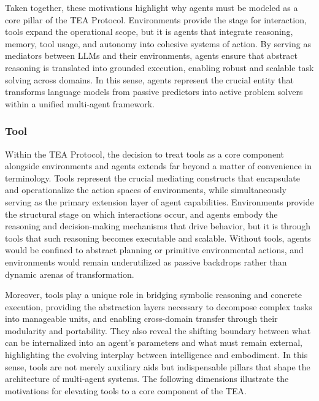 \documentclass[11pt]{article}
\begin{document}
Taken together, these motivations highlight why agents must be modeled as a core pillar of the TEA Protocol. Environments provide the stage for interaction, tools expand the operational scope, but it is agents that integrate reasoning, memory, tool usage, and autonomy into cohesive systems of action. By serving as mediators between LLMs and their environments, agents ensure that abstract reasoning is translated into grounded execution, enabling robust and scalable task solving across domains. In this sense, agents represent the crucial entity that transforms language models from passive predictors into active problem solvers within a unified multi-agent framework.   

\subsubsection{Tool}

Within the TEA Protocol, the decision to treat tools as a core component alongside environments and agents extends far beyond a matter of convenience in terminology. Tools represent the crucial mediating constructs that encapsulate and operationalize the action spaces of environments, while simultaneously serving as the primary extension layer of agent capabilities. Environments provide the structural stage on which interactions occur, and agents embody the reasoning and decision-making mechanisms that drive behavior, but it is through tools that such reasoning becomes executable and scalable. Without tools, agents would be confined to abstract planning or primitive environmental actions, and environments would remain underutilized as passive backdrops rather than dynamic arenas of transformation. 

Moreover, tools play a unique role in bridging symbolic reasoning and concrete execution, providing the abstraction layers necessary to decompose complex tasks into manageable units, and enabling cross-domain transfer through their modularity and portability. They also reveal the shifting boundary between what can be internalized into an agent’s parameters and what must remain external, highlighting the evolving interplay between intelligence and embodiment. In this sense, tools are not merely auxiliary aids but indispensable pillars that shape the architecture of multi-agent systems. The following dimensions illustrate the motivations for elevating tools to a core component of the TEA.
\end{document}
